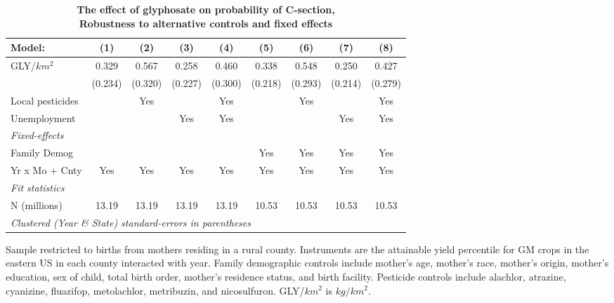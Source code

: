 \begin{table}[htbp]
   \centering
   \small
   \begin{threeparttable}[b]
      \caption{\label{tab:robust-cntrl-c_section-e100myielddiffpercentilegmo} \textbf{The effect of glyphosate on probability of C-section, \\ Robustness to alternative controls and fixed effects}}
      \begin{tabular}{lcccccccc}
         \toprule
         Model:           & (1)     & (2)     & (3)     & (4)     & (5)     & (6)     & (7)     & (8)\\  
         \midrule 
         GLY/$km^2$       & 0.329   & 0.567   & 0.258   & 0.460   & 0.338   & 0.548   & 0.250   & 0.427\\   
                          & (0.234) & (0.320) & (0.227) & (0.300) & (0.218) & (0.293) & (0.214) & (0.279)\\   
         Local pesticides &         & Yes     &         & Yes     &         & Yes     &         & Yes\\  
         Unemployment     &         &         & Yes     & Yes     &         &         & Yes     & Yes\\  
         \midrule
         \emph{Fixed-effects}\\
         Family Demog     &         &         &         &         & Yes     & Yes     & Yes     & Yes\\  
         Yr x Mo + Cnty   & Yes     & Yes     & Yes     & Yes     & Yes     & Yes     & Yes     & Yes\\  
         \midrule
         \emph{Fit statistics}\\
         N (millions)     & 13.19   & 13.19   & 13.19   & 13.19   & 10.53   & 10.53   & 10.53   & 10.53\\  
         \midrule
         \multicolumn{9}{l}{\emph{Clustered (Year \& State) standard-errors in parentheses}}\\
      \end{tabular}
      
      \begin{tablenotes}\item Sample restricted to births from mothers residing in a rural county. Instruments are the attainable yield percentile for GM crops in the eastern US in each county interacted with year. Family demographic controls include mother's age, mother's race, mother's origin, mother's education, sex of child, total birth order, mother's residence status, and birth facility. Pesticide controls include alachlor, atrazine, cyanizine, fluazifop, metolachlor, metribuzin, and nicosulfuron. GLY/$km^2$ is $kg/km^2$.
      \end{tablenotes}
   \end{threeparttable}
\end{table}
